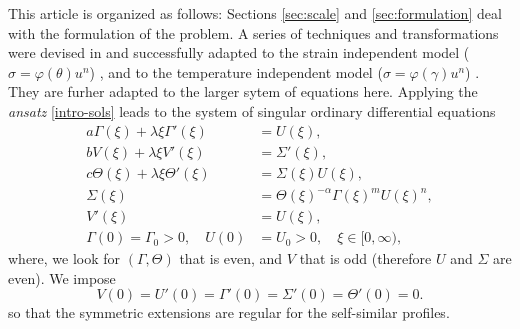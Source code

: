\documentclass[a4paper,11pt]{article}
\theoremstyle{remark}
\begin{document}
This article is organized as follows: 
Sections \ref{sec:scale} and  \ref{sec:formulation} deal with the formulation of the problem. A series of techniques and transformations were devised in
 \cite{KOT14} and successfully adapted to the strain independent model ($\sigma=\varphi(\theta)u^n$) \cite{KLT_HYP2016}, 
 and to the temperature independent model ($\sigma=\varphi(\gamma)u^n$) \cite{LT16,KLT_2016}. 
 They are furher adapted to the larger sytem of equations here. Applying the {\it ansatz} \eqref{intro-sols} leads to the system of 
 singular ordinary differential equations
\begin{equation} \label{intro:ss-odes}
\begin{aligned}
 a \Gamma(\xi) + \lambda \xi \Gamma'(\xi) &= U(\xi), \\
 b V(\xi) + \lambda \xi V'(\xi) &= \Sigma'(\xi), \\
 c \Theta(\xi) + \lambda \xi \Theta'(\xi)&=\Sigma(\xi) U(\xi),\\
 \Sigma(\xi) &= \Theta(\xi)^{-\alpha} \Gamma(\xi)^m U(\xi)^n, \\
 V'(\xi)&=U(\xi),\\
 \Gamma(0)=\Gamma_0>0, \quad U(0)&=U_0>0, \quad \text{$\xi \in [0,\infty)$},
\end{aligned}
\end{equation}
where, we look for $(\Gamma,\Theta)$ that is even, and $V$ that is odd (therefore $U$ and $\Sigma$ are even). We impose
\begin{equation}
 V(0)=U'(0)=\Gamma'(0)=\Sigma'(0)=\Theta'(0)=0. \label{intro:bdry0}
\end{equation}
so that the symmetric extensions are regular for the self-similar profiles.
\end{document}
